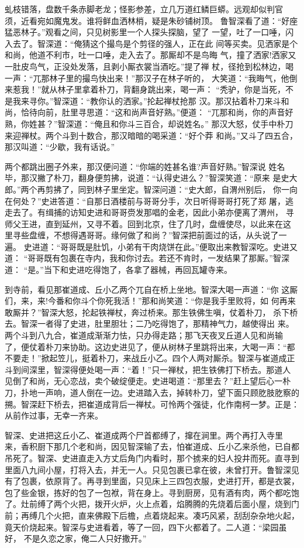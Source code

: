 虬枝错落，盘数千条赤脚老龙；怪影参差，立几万道红鳞巨蟒。远观却似判官
须，近看宛如魔鬼发。谁将鲜血洒林梢，疑是朱砂铺树顶。
鲁智深看了道：“好座猛恶林子。”观看之间，只见树影里一个人探头探脑，望了
一望，吐了一口唾，闪入去了。智深道：“俺猜这个撮鸟是个剪径的强人，正在此
间等买卖。见洒家是个和尚，他道不利市，吐一口唾，走入去了。那厮却不是鸟晦
气，撞了洒家!洒家又一肚皮鸟气，正没处发落，且剥小厮衣裳当酒吃。”提了禅
杖，径抢到松林边，喝一声：“兀那林子里的撮鸟快出来！”那汉子在林子听的，
大笑道：“我晦气，他倒来惹我！”就从林子里拿着朴刀，背翻身跳出来，喝一声：
“秃驴，你是当死，不是我来寻你。”智深道：“教你认的洒家。”抡起禅杖抢那
汉。那汉拈着朴刀来斗和尚，恰待向前，肚里寻思道：“这和尚声音好熟。”便道：
“兀那和尚，你的声音好熟，你姓甚？”智深道：“俺且和你斗三百合，却说姓名。”
那汉大怒，仗手中朴刀来迎禅杖。两个斗到十数合，那汉暗暗的喝采道：“好个莽
和尚。”又斗了四五合，那汉叫道：“少歇，我有话说。”

两个都跳出圈子外来，那汉便问道：“你端的姓甚名谁?声音好熟。”智深说
姓名毕，那汉撇了朴刀，翻身便剪拂，说道：“认得史进么？”智深笑道：“原来
是史大郎。”两个再剪拂了，同到林子里坐定。智深问道：“史大郎，自渭州别后，
你一向在何处？”史进答道：“自那日酒楼前与哥哥分手，次日听得哥哥打死了郑
屠，逃走去了。有缉捕的访知史进和哥哥赍发那唱的金老，因此小弟亦便离了渭州，
寻师父王进，直到延州，又寻不着。回到北京，住了几时，盘缠使尽，以此来在这
里寻些盘缠，不想得遇哥哥。缘何做了和尚？”智深把前面过的话，从头说了一遍。
史进道：“哥哥既是肚饥，小弟有干肉烧饼在此。”便取出来教智深吃。史进又道：
“哥哥既有包裹在寺内，我和你讨去。若还不肯时，一发结果了那厮。”智深道：
“是。”当下和史进吃得饱了，各拿了器械，再回瓦罐寺来。

到寺前，看见那崔道成、丘小乙两个兀自在桥上坐地。智深大喝一声道：“你
这厮们，来，来!今番和你斗个你死我活！”那和尚笑道：“你是我手里败将，如
何再来敢厮并？”智深大怒，抡起铁禅杖，奔过桥来。那生铁佛生嗔，仗着朴刀，
杀下桥去。智深一者得了史进，肚里胆壮；二乃吃得饱了，那精神气力，越使得出
来。两个斗到八九合，崔道成渐渐力怯，只办得走路；那飞天夜叉丘道人见和尚输
了，便仗着朴刀来协助。这边史进见了，便从树林子里跳将出来，大喝一声：“都
不要走！”掀起笠儿，挺着朴刀，来战丘小乙。四个人两对厮杀。智深与崔道成正
斗到间深里，智深得便处喝一声：“着！”只一禅杖，把生铁佛打下桥去。那道人
见倒了和尚，无心恋战，卖个破绽便走。史进喝道：“那里去？”赶上望后心一朴
刀，扑地一声响，道人倒在一边。史进踏入去，掉转朴刀，望下面只顾肐肢肐察的
搠。智深赶下桥去，把崔道成背后一禅杖。可怜两个强徒，化作南柯一梦。正是：
从前作过事，无幸一齐来。

智深、史进把这丘小乙、崔道成两个尸首都缚了，撺在涧里。两个再打入寺里
来，香积厨下那几个老和尚，因见智深输了去，怕崔道成、丘小乙来杀他，已自都
吊死了。智深、史进直走入方丈后角门内看时，那个掳来的妇人投井而死。直寻到
里面八九间小屋，打将入去，并无一人。只见包裹已拿在彼，未曾打开。鲁智深见
有了包裹，依原背了。再寻到里面，只见床上三四包衣服，史进打开，都是衣裳，
包了些金银，拣好的包了一包袱，背在身上。寻到厨房，见有酒有肉，两个都吃饱
了。灶前缚了两个火把，拨开火炉，火上点着，焰腾腾的先烧着后面小屋，烧到门
前；再缚几个火把，直来佛殿下后檐，点着烧起来。凑巧风紧，刮刮杂杂地火起，
竟天价烧起来。智深与史进看着，等了一回，四下火都着了。二人道：“梁园虽好，
不是久恋之家，俺二人只好撒开。”

